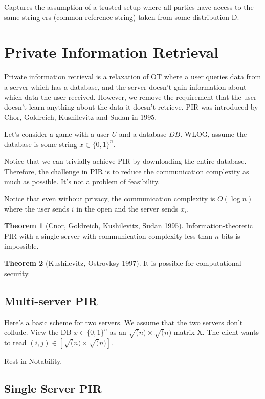 \documentclass{article}
\theoremstyle{definition}
\newtheorem{theorem}{Theorem}[section]
\newcommand{\bitstring}[1]{\{0,1\}^{#1}}
\begin{document}
Captures the assumption of a trusted setup where all 
parties have access to the same string crs 
(common reference string) taken from some distribution D.

\newpage

\section{Private Information Retrieval}

Private information retrieval is a relaxation of OT where a user queries data from a server which has a database, and the server doesn't gain 
information about which data the user received. However, we remove the requirement that the user doesn't learn anything about the data it doesn't retrieve.
PIR was introduced by Chor, Goldreich, Kushilevitz and Sudan in 1995.

Let's consider a game with a user $U$ and a database $DB$.
WLOG, assume the database is some string $x \in \bitstring{n}$.

Notice that we can trivially achieve PIR by downloading the entire database.
Therefore, the challenge in PIR is to reduce the communication complexity as much as possible. It's not a problem
of feasibility.

Notice that even without privacy, the communication complexity is $O(\log n)$ where the user sends $i$ in the open and the server sends $x_{i}$.

\begin{theorem}[Cnor, Goldreich, Kushilevitz, Sudan 1995]
    Information-theoretic PIR with a single server with communication complexity less than $n$ bits is impossible.
\end{theorem}

\begin{theorem}[Kushilevitz, Ostrovksy 1997]
    It is possible for computational security.
\end{theorem}


\subsection{Multi-server PIR}

Here's a basic scheme for two servers. We assume that the two servers don't collude.
View the DB $x \in \bitstring{n}$ as an $\sqrt(n) \times \sqrt(n)$ matrix X.
The client wants to read $(i,j) \in [\sqrt(n) \times \sqrt(n)]$.

Rest in Notability.

\subsection{Single Server PIR}
\end{document}

